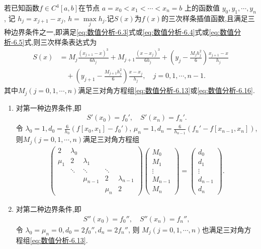 \documentclass[../../main.tex]{subfiles}%
\begin{document}
\begin{theorem}
若已知函数$f\in C^4[a,b]$在节点 $a = x_0 < x_1 < \cdots < x_n = b$ 上的函数值 $y_0, y_1, \cdots, y_n$, 记 $h_j = x_{j + 1} - x_j$, $h = \max\limits_j h_j$.记$S(x)$为$f(x)$的三次样条插值函数,且满足三种边界条件之一,即满足\eqref{eq:数值分析-6.3}式或\eqref{eq:数值分析-6.4}式或\eqref{eq:数值分析-6.5}式,则三次样条表达式为
\begin{align}
S(x) &= M_j \frac{(x_{j + 1} - x)^3}{6 h_j} + M_{j + 1} \frac{(x - x_j)^3}{6 h_j} + \left( y_j - \frac{M_j h_j^2}{6} \right) \frac{x_{j + 1} - x}{h_j} \nonumber \\
&\quad + \left( y_{j + 1} - \frac{M_{j + 1} h_j^2}{6} \right) \frac{x - x_j}{h_j}, \quad j = 0, 1, \cdots, n - 1. \label{eq:数值分析-6..8}
\end{align}
其中$M_j(j=0,1,\cdots,n)$满足三对角方程组\eqref{eq:数值分析-6.13}或\eqref{eq:数值分析-6.16}.
\begin{enumerate}[(1)]
\item 对第一种边界条件,即
\begin{align*}
S'(x_0) = f_0', \quad S'(x_n) = f_n'.
\end{align*}
令 $\lambda_0 = 1, d_0 = \frac{6}{h_0} (f[x_0, x_1] - f_0')$, $\mu_n = 1, d_n = \frac{6}{h_{n - 1}} (f_n' - f[x_{n - 1}, x_n])$,则$M_j(j=0,1,\cdots,n)$满足三对角方程组
\begin{align}
\begin{pmatrix}
2 & \lambda_0 \\
\mu_1 & 2 & \lambda_1 \\
& \ddots & \ddots & \ddots \\
& & \mu_{n - 1} & 2 & \lambda_{n - 1} \\
& & & \mu_n & 2
\end{pmatrix}
\begin{pmatrix}
M_0 \\
M_1 \\
\vdots \\
M_{n - 1} \\
M_n
\end{pmatrix}
=
\begin{pmatrix}
d_0 \\
d_1 \\
\vdots \\
d_{n - 1} \\
d_n
\end{pmatrix}. \label{eq:数值分析-6.13}
\end{align}

\item 对第二种边界条件,即
\begin{align*}
S''(x_0) = f_0'', \quad S''(x_n) = f_n'', 
\end{align*}
令 $\lambda_0 = \mu_n = 0, d_0 = 2 f_0'', d_n = 2 f_n''$, 则
$M_j(j=0,1,\cdots,n)$也满足三对角方程组\eqref{eq:数值分析-6.13}. 


\end{enumerate}
\end{theorem}
\end{document}
